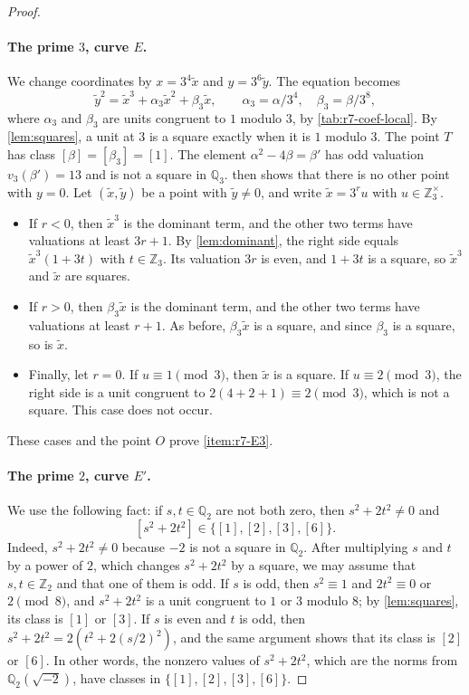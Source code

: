 \documentclass[12pt,oneside,openany]{book}
\theoremstyle{definition}
\theoremstyle{plain}
\numberwithin{equation}{chapter}
\theoremstyle{plain}
\theoremstyle{definition}
\theoremstyle{remark}
\newcommand{\Q}{\mathbb Q}
\newcommand{\Z}{\mathbb Z}
\newcommand{\sq}[1]{[#1]}
\begin{document}
\begin{proof}
\paragraph{The prime $3$, curve $E$.}
We change coordinates by $x=3^4\tilde x$ and $y=3^6\tilde y$. The equation becomes
\[
 \tilde y^2=\tilde x^3+\alpha_3\tilde x^2+\beta_3\tilde x,\qquad \alpha_3=\alpha/3^4,\quad
 \beta_3=\beta/3^8,
\]
where $\alpha_3$ and $\beta_3$ are units congruent to $1$ modulo $3$, by
\cref{tab:r7-coef-local}. By \cref{lem:squares}, a unit at $3$ is a square
exactly when it is $1$ modulo $3$. The point $T$ has class
$\sq\beta=\sq{\beta_3}=\sq1$. The element $\alpha^2-4\beta=\beta'$ has odd
valuation $v_3(\beta')=13$ and is not a square in $\Q_3$.
 then shows that there is no other point with
$y=0$. Let
$(\tilde x,\tilde y)$ be a point with $\tilde y\ne0$, and write $\tilde x=3^ru$ with
$u\in\Z_3^\times$.
\begin{itemize}
\item If $r<0$, then $\tilde x^3$ is the dominant term, and the other two terms
have valuations at least $3r+1$. By \cref{lem:dominant}, the right side
equals $\tilde x^3(1+3t)$ with $t\in\Z_3$. Its valuation $3r$ is even, and
$1+3t$ is a square, so $\tilde x^3$ and $\tilde x$ are squares.
\item If $r>0$, then $\beta_3\tilde x$ is the dominant term, and the other two
terms have valuations at least $r+1$. As before, $\beta_3\tilde x$ is a square, and
since $\beta_3$ is a square, so is $\tilde x$.
\item Finally, let $r=0$. If $u\equiv1\pmod3$, then $\tilde x$ is a square. If
$u\equiv2\pmod3$, the right side is a unit congruent to
$2(4+2+1)\equiv2\pmod3$, which is not a square. This case does not occur.
\end{itemize}
These cases and the point $O$ prove \ref{item:r7-E3}.

\paragraph{The prime $2$, curve $E'$.}
We use the following fact: if $s,t\in\Q_2$ are not both zero, then
$s^2+2t^2\ne0$ and
\begin{equation}\label{r7:norm-classes}
 \sq{s^2+2t^2}\in\{\sq1,\sq2,\sq3,\sq6\}.
\end{equation}
Indeed, $s^2+2t^2\ne0$ because $-2$ is not a square in $\Q_2$. After
multiplying $s$ and $t$ by a power of $2$, which changes $s^2+2t^2$ by a
square, we may assume that $s,t\in\Z_2$ and that one of them is odd. If $s$ is odd, then
$s^2\equiv1$ and $2t^2\equiv0$ or $2\pmod8$, and $s^2+2t^2$ is a unit
congruent to $1$ or $3$ modulo $8$; by \cref{lem:squares}, its class is
$\sq1$ or $\sq3$. If $s$ is even and $t$ is odd, then
$s^2+2t^2=2(t^2+2(s/2)^2)$, and the same argument shows that its class is
$\sq2$ or $\sq6$. In other words, the nonzero values of $s^2+2t^2$, which
are the norms from $\Q_2(\sqrt{-2})$, have classes in
$\{\sq1,\sq2,\sq3,\sq6\}$.


\end{proof}
\end{document}
